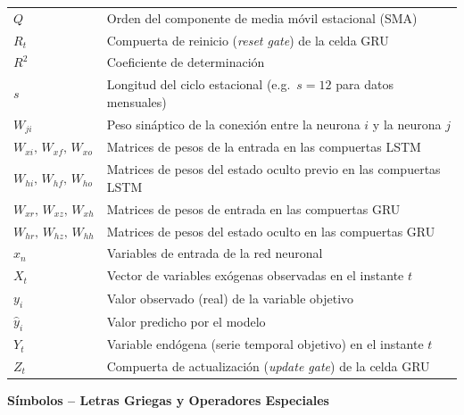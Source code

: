 \begin{longtable}{p{3.5cm} p{10.5cm}}
$Q$                      & Orden del componente de media móvil estacional (SMA) \\[3pt]
$R_t$                    & Compuerta de reinicio (\textit{reset gate}) de la celda GRU \\[3pt]
$R^{2}$                  & Coeficiente de determinación \\[3pt]
$s$                      & Longitud del ciclo estacional (e.g.\ $s=12$ para datos mensuales) \\[3pt]
$W_{ji}$                 & Peso sináptico de la conexión entre la neurona $i$ y la neurona $j$ \\[3pt]
$W_{xi},\,W_{xf},\,W_{xo}$ & Matrices de pesos de la entrada en las compuertas LSTM \\[3pt]
$W_{hi},\,W_{hf},\,W_{ho}$ & Matrices de pesos del estado oculto previo en las compuertas LSTM \\[3pt]
$W_{xr},\,W_{xz},\,W_{xh}$ & Matrices de pesos de entrada en las compuertas GRU \\[3pt]
$W_{hr},\,W_{hz},\,W_{hh}$ & Matrices de pesos del estado oculto en las compuertas GRU \\[3pt]
$x_n$                    & Variables de entrada de la red neuronal \\[3pt]
$X_t$                    & Vector de variables exógenas observadas en el instante $t$ \\[3pt]
$y_i$                    & Valor observado (real) de la variable objetivo \\[3pt]
$\hat{y}_i$              & Valor predicho por el modelo \\[3pt]
$Y_t$                    & Variable endógena (serie temporal objetivo) en el instante $t$ \\[3pt]
$Z_t$                    & Compuerta de actualización (\textit{update gate}) de la celda GRU \\[3pt]
\end{longtable}

\vspace{0.5cm}

\clearpage
\noindent\textbf{Símbolos -- Letras Griegas y Operadores Especiales}

\vspace{0.25cm}

